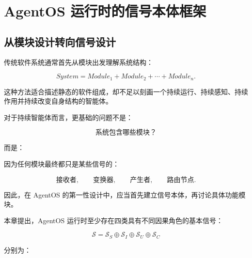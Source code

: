 \chapter{AgentOS 运行时的信号本体框架}

\section{从模块设计转向信号设计}

传统软件系统通常首先从模块出发理解系统结构：

\[
System
=
Module_1
+
Module_2
+
\cdots
+
Module_n.
\]

这种方法适合描述静态的软件组成，却不足以刻画一个持续运行、持续感知、持续作用并持续改变自身结构的智能体。

对于持续智能体而言，更基础的问题不是：

\[
\text{系统包含哪些模块？}
\]

而是：

\begin{statementbox}
\centering
{}
\end{statementbox}

因为任何模块最终都只是某些信号的：

\[
\text{接收者},
\qquad
\text{变换器},
\qquad
\text{产生者},
\qquad
\text{路由节点}.
\]

因此，在 AgentOS 的第一性设计中，应当首先建立信号本体，再讨论具体功能模块。

本章提出，AgentOS 运行时至少存在四类具有不同因果角色的基本信号：

\[
\boxed{
\mathcal S
=
\mathcal S_S
\oplus
\mathcal S_I
\oplus
\mathcal S_U
\oplus
\mathcal S_C
}
\]

分别为：

\begin{statementbox}
\centering
{}
\end{statementbox}

\begin{statementbox}
\centering
{}
\end{statementbox}

\begin{statementbox}
\centering
{}
\end{statementbox}

